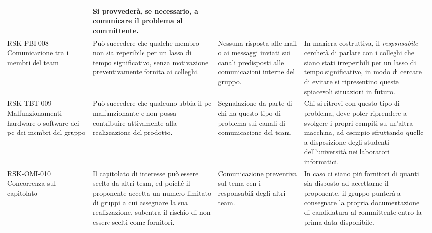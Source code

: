 \begin{center}
\begin{longtable}{|p{3cm}|p{4cm}|p{3.5cm}|p{3.5cm}|}
	& Si provvederà, se necessario, a comunicare il problema al committente.  \\
	\hline
	
		\hline
	RSK-PBI-008 \newline Comunicazione tra i membri del team
	 & 
	Può succedere che qualche membro non sia reperibile per un lasso di tempo significativo, senza motivazione preventivamente fornita ai colleghi.
	&   

	Nessuna risposta alle mail o ai messaggi inviati sui canali predisposti alle comunicazioni interne del gruppo.
	 
	& In maniera costruttiva, il \textit{responsabile}
	   cercherà di parlare con i colleghi che siano stati irreperibili per un lasso di tempo significativo, in modo di cercare di evitare si ripresentino queste spiacevoli situazioni in futuro. \\
	\hline
	
			\hline
	RSK-TBT-009 \newline Malfunzionamenti hardware o software dei pc dei membri del gruppo
	 & 
	Può succedere che qualcuno abbia il pc malfunzionante e non possa contribuire attivamente alla realizzazione del prodotto.
	&   

	Segnalazione da parte di chi ha questo tipo di problema sui canali di comunicazione del team.
	 
	& Chi si ritrovi con questo tipo di problema, deve poter riprendere a svolgere i propri compiti su un'altra macchina, ad esempio sfruttando quelle a disposizione degli studenti dell'università nei laboratori informatici. \\
	\hline
	
	
				\hline
	RSK-OMI-010 \newline Concorrenza sul capitolato
	 & 
	Il capitolato di interesse può essere scelto da altri team, ed poiché il proponente accetta un numero limitato di gruppi a cui assegnare la sua realizzazione, subentra il rischio di non essere scelti come fornitori.
	&   

	Comunicazione preventiva sul tema con i responsabili degli altri team.
	 
	& In caso ci siano più fornitori di quanti sia disposto ad accettarne il proponente, il gruppo punterà a consegnare la propria documentazione di candidatura al committente entro la prima data disponibile. \\
	\hline
	
	
	\end{longtable}
\end{center}